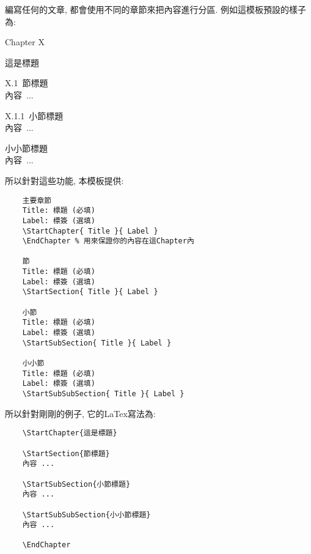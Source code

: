 
編寫任何的文章, 都會使用不同的章節來把內容進行分區. 例如這模板預設的樣子為:
\begin{DescriptionFrame}
  \vspace{0.2cm}
  \centerline{\LARGE Chapter X}
  \vspace{0.3cm}
  \centerline{\LARGE 這是標題}

  \vspace{0.5cm}
  \mbox{\Large X.1 節標題}\\
  \mbox{\hspace{1.2cm}內容 ...}

  \vspace{0.3cm}
  \mbox{\large X.1.1 小節標題}\\
  \mbox{\hspace{1.2cm}內容 ...}

  \vspace{0.3cm}
  \mbox{\large 小小節標題}\\
  \mbox{\hspace{1.2cm}內容 ...}
\end{DescriptionFrame}

所以針對這些功能, 本模板提供:
\begin{DescriptionFrame}
  \begin{verbatim}
    主要章節
    Title: 標題 (必填)
    Label: 標簽 (選填)
    \StartChapter{ Title }{ Label }
    \EndChapter % 用來保證你的內容在這Chapter內

    節
    Title: 標題 (必填)
    Label: 標簽 (選填)
    \StartSection{ Title }{ Label }

    小節
    Title: 標題 (必填)
    Label: 標簽 (選填)
    \StartSubSection{ Title }{ Label }

    小小節
    Title: 標題 (必填)
    Label: 標簽 (選填)
    \StartSubSubSection{ Title }{ Label }
  \end{verbatim}
\end{DescriptionFrame}

所以針對剛剛的例子, 它的LaTex寫法為:\\

\begin{DescriptionFrame}
  \begin{verbatim}
    \StartChapter{這是標題}

    \StartSection{節標題}
    內容 ...

    \StartSubSection{小節標題}
    內容 ...

    \StartSubSubSection{小小節標題}
    內容 ...

    \EndChapter
  \end{verbatim}
\end{DescriptionFrame}
